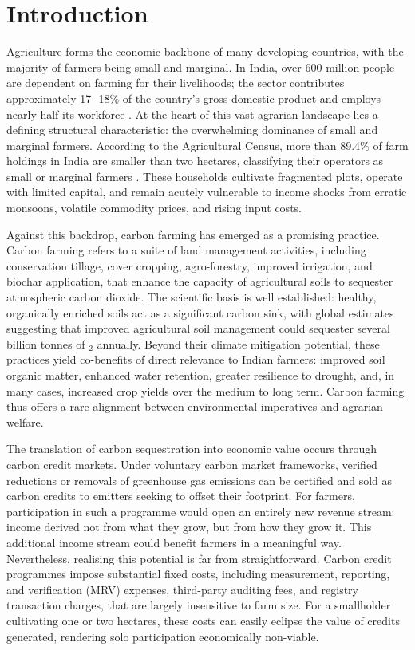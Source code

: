 \documentclass[manuscript, screen]{acmart}
\begin{document}
\section{Introduction}
Agriculture forms the economic backbone of many developing countries, with the majority of farmers being small and marginal. In India, over 600 million people are dependent on farming for their livelihoods; the sector contributes approximately 17- 18\% of the country's gross domestic product and employs nearly half its workforce \cite{MOSPI2024}. At the heart of this vast agrarian landscape lies a defining structural characteristic: the overwhelming dominance of small and marginal farmers. According to the Agricultural Census, more than 89.4\% of farm holdings in India are smaller than two hectares, classifying their operators as small or marginal farmers \cite{MoAFW2023SmallFarmers}. These households cultivate fragmented plots, operate with limited capital, and remain acutely vulnerable to income shocks from erratic monsoons, volatile commodity prices, and rising input costs.

Against this backdrop, carbon farming has emerged as a promising practice. Carbon farming refers to a suite of land management activities, including conservation tillage, cover cropping, agro-forestry, improved irrigation, and biochar application, that enhance the capacity of agricultural soils to sequester atmospheric carbon dioxide. The scientific basis is well established: healthy, organically enriched soils act as a significant carbon sink, with global estimates suggesting that improved agricultural soil management could sequester several billion tonnes of $_2$ annually. Beyond their climate mitigation potential, these practices yield co-benefits of direct relevance to Indian farmers: improved soil organic matter, enhanced water retention, greater resilience to drought, and, in many cases, increased crop yields over the medium to long term. Carbon farming thus offers a rare alignment between environmental imperatives and agrarian welfare.

The translation of carbon sequestration into economic value occurs through carbon credit markets. Under voluntary carbon market frameworks, verified reductions or removals of greenhouse gas emissions can be certified and sold as carbon credits to emitters seeking to offset their footprint. For farmers, participation in such a programme would open an entirely new revenue stream: income derived not from what they grow, but from how they grow it. This additional income stream could benefit farmers in a meaningful way. Nevertheless, realising this potential is far from straightforward. Carbon credit programmes impose substantial fixed costs, including measurement, reporting, and verification (MRV) expenses, third-party auditing fees, and registry transaction charges, that are largely insensitive to farm size. For a smallholder cultivating one or two hectares, these costs can easily eclipse the value of credits generated, rendering solo participation economically non-viable.
\end{document}
